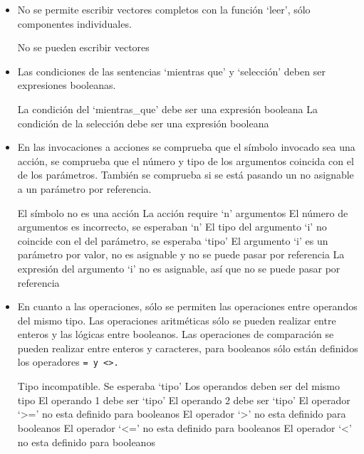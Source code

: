 \begin{itemize}
    \item No se permite escribir vectores completos con la función `leer', sólo componentes individuales.

    \begin{codigo}
    No se pueden escribir vectores
    \end{codigo}


    \item Las condiciones de las sentencias `mientras que' y `selección' deben ser expresiones booleanas.

    \begin{codigo}
    La condición del `mientras_que' debe ser una expresión booleana
    La condición de la selección debe ser una expresión booleana
    \end{codigo}


    \item En las invocaciones a acciones se comprueba que el símbolo invocado sea una acción, se comprueba que el número y tipo de los argumentos coincida con el de los parámetros. También se comprueba si se está pasando un no asignable a un parámetro por referencia.

    \begin{codigo}
    El símbolo no es una acción
    La acción require `n' argumentos
    El número de argumentos es incorrecto, se esperaban `n'
    El tipo del argumento `i' no coincide con el del parámetro, se esperaba `tipo'
    El argumento `i' es un parámetro por valor, no es asignable y no se puede pasar por referencia
    La expresión del argumento `i' no es asignable, así que no se puede pasar por referencia
    \end{codigo}


    \item En cuanto a las operaciones, sólo se permiten las operaciones entre operandos del mismo tipo. Las operaciones aritméticas sólo se pueden realizar entre enteros y las lógicas entre booleanos. Las operaciones de comparación se pueden realizar entre enteros y caracteres, para booleanos sólo están definidos los operadores \tt{=} y \tt{<>}.

    \begin{codigo}
    Tipo incompatible. Se esperaba `tipo'
    Los operandos deben ser del mismo tipo
    El operando 1 debe ser `tipo'
    El operando 2 debe ser `tipo'
    El operador `>=' no esta definido para booleanos
    El operador `>' no esta definido para booleanos
    El operador `<=' no esta definido para booleanos
    El operador `<' no esta definido para booleanos
    \end{codigo}



\end{itemize}
